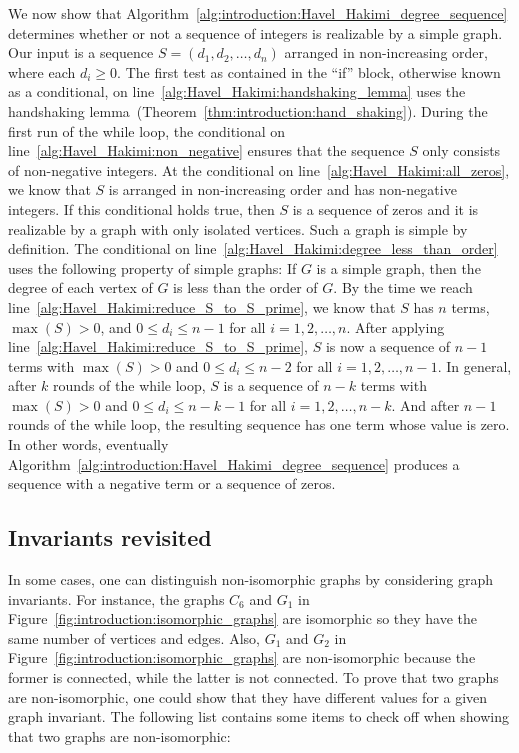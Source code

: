 We now show that
Algorithm~\ref{alg:introduction:Havel_Hakimi_degree_sequence}
determines whether or not a sequence of integers is realizable by a
simple graph. Our input is a sequence $S = (d_1, d_2, \dots, d_n)$
arranged in non-increasing order, where each $d_i \geq 0$. The first
test as contained in the ``if'' block, otherwise known as a
conditional, on line~\ref{alg:Havel_Hakimi:handshaking_lemma} uses the
handshaking
lemma~(Theorem~\ref{thm:introduction:hand_shaking}). During the first
run of the while loop, the conditional on
line~\ref{alg:Havel_Hakimi:non_negative} ensures that the sequence $S$
only consists of non-negative integers. At the conditional on
line~\ref{alg:Havel_Hakimi:all_zeros}, we know that $S$ is arranged in
non-increasing order and has non-negative integers. If this
conditional holds true, then $S$ is a sequence of zeros and it is
realizable by a graph with only isolated vertices. Such a graph is
simple by definition. The conditional on
line~\ref{alg:Havel_Hakimi:degree_less_than_order} uses the following
property of simple graphs: If $G$ is a simple graph, then the degree
of each vertex of $G$ is less than the order of $G$. By the time we
reach line~\ref{alg:Havel_Hakimi:reduce_S_to_S_prime}, we know that
$S$ has $n$ terms, $\max(S) > 0$, and $0 \leq d_i \leq n - 1$ for all
$i = 1, 2, \dots, n$. After applying
line~\ref{alg:Havel_Hakimi:reduce_S_to_S_prime}, $S$ is now a sequence
of $n - 1$ terms with $\max(S) > 0$ and $0 \leq d_i \leq n - 2$ for all
$i = 1, 2, \dots, n-1$. In general, after $k$ rounds of the while
loop, $S$ is a sequence of $n - k$ terms with $\max(S) > 0$ and
$0 \leq d_i \leq n - k - 1$ for all $i = 1, 2, \dots, n-k$. And after
$n - 1$ rounds of the while loop, the resulting sequence has one term
whose value is zero. In other words, eventually
Algorithm~\ref{alg:introduction:Havel_Hakimi_degree_sequence} produces
a sequence with a negative term or a sequence of zeros.



\subsection{Invariants revisited}

In some cases, one can distinguish non-isomorphic graphs by
considering graph invariants. For instance, the graphs $C_6$ and $G_1$
in Figure~\ref{fig:introduction:isomorphic_graphs} are isomorphic so
they have the same number of vertices and edges. Also, $G_1$ and $G_2$
in Figure~\ref{fig:introduction:isomorphic_graphs}  are non-isomorphic
because the former is connected, while the latter is not connected. To
prove that two graphs are non-isomorphic, one could show that they
have different values for a given graph invariant. The following list
contains some items to check off when showing that two graphs are
non-isomorphic:

